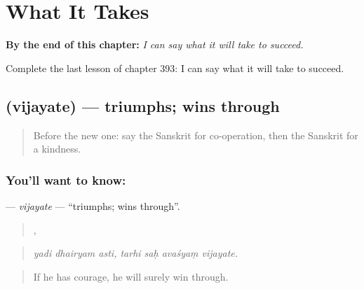 
\chapter{What It Takes}
\label{ch:sa-what-it-takes}

\begin{chapteropening}
\textbf{By the end of this chapter:} \emph{I can say what it will take to succeed.}

Complete the last lesson of chapter 393: I can say what it will take to succeed.
\end{chapteropening}

\section[\texorpdfstring{\sk{विजयते} (vijayate)}{विजयते (vijayate)}]{ (vijayate) — triumphs; wins through}

\label{lesson:SA-C393-vijayate}



\begin{quote}
Before the new one: say the Sanskrit for co-operation, then the Sanskrit for a kindness.
\end{quote}

\subsection*{You'll want to know: }
\textbf{} — \emph{vijayate} — \textquotedblleft{}triumphs; wins through\textquotedblright{}.

\begin{quote}
  ,    
\end{quote}

\begin{quote}
\emph{yadi dhairyam asti, tarhi saḥ avaśyaṃ vijayate.}
\end{quote}

\begin{quote}
If he has courage, he will surely win through.
\end{quote}


